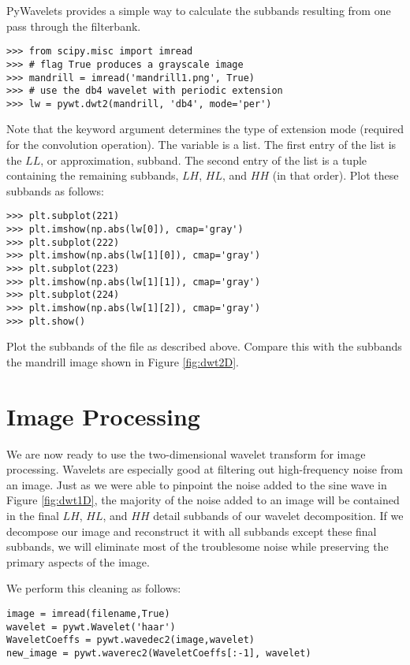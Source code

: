PyWavelets provides a simple way to calculate the subbands resulting from one pass through the filterbank.
\begin{lstlisting}
>>> from scipy.misc import imread
>>> # flag True produces a grayscale image
>>> mandrill = imread('mandrill1.png', True) 
>>> # use the db4 wavelet with periodic extension
>>> lw = pywt.dwt2(mandrill, 'db4', mode='per')
\end{lstlisting}
Note that the  keyword argument determines the type of extension mode (required for the convolution
operation).
The variable  is a list. The first entry of the list is the $LL$, or approximation, subband.
The second entry of the list is a tuple containing the remaining subbands, $LH$, $HL$, and $HH$ (in that order).
Plot these subbands as follows:
\begin{lstlisting}
>>> plt.subplot(221)
>>> plt.imshow(np.abs(lw[0]), cmap='gray')
>>> plt.subplot(222)
>>> plt.imshow(np.abs(lw[1][0]), cmap='gray')
>>> plt.subplot(223)
>>> plt.imshow(np.abs(lw[1][1]), cmap='gray')
>>> plt.subplot(224)
>>> plt.imshow(np.abs(lw[1][2]), cmap='gray')
>>> plt.show()
\end{lstlisting}

\begin{problem}
Plot the subbands of the file  as described above.
Compare this with the subbands the mandrill image shown in Figure \ref{fig:dwt2D}.
\end{problem}

\section*{Image Processing}
We are now ready to use the two-dimensional wavelet transform for image processing.
Wavelets are especially good at filtering out high-frequency noise from an image.
Just as we were able to pinpoint the noise added to the sine wave in Figure \ref{fig:dwt1D}, the majority of the noise added to an image will be contained in the final $LH$, $HL$, and $HH$ detail subbands of our wavelet decomposition.
If we decompose our image and reconstruct it with all subbands except these final subbands, we will eliminate most of the troublesome noise while preserving the primary aspects of the image.

We perform this cleaning as follows:
\begin{lstlisting}
image = imread(filename,True)
wavelet = pywt.Wavelet('haar')
WaveletCoeffs = pywt.wavedec2(image,wavelet)
new_image = pywt.waverec2(WaveletCoeffs[:-1], wavelet)
\end{lstlisting}

